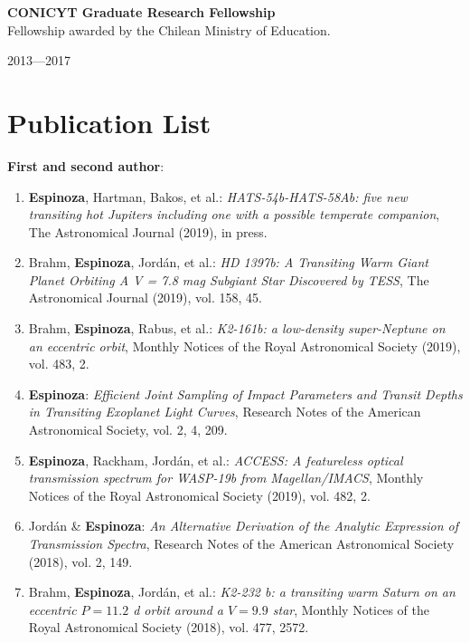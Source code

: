 \documentclass[12pt, a4paper]{article} %
\begin{document}
\begin{minipage}[t]{0.7\textwidth}
\begin{flushleft}%
  \setlength{\leftskip}{0.2cm}%
\textbf{CONICYT Graduate Research Fellowship}\\
Fellowship awarded by the Chilean Ministry of Education.
\end{flushleft}
\end{minipage}
\begin{minipage}[t]{0.3\textwidth}
\hfill 2013---2017
\end{minipage}

\section*{Publication List}
\begin{flushleft}%
  \setlength{\leftskip}{0.2cm}%
\textbf{First and second author}:
\begin{enumerate}
\setlength\itemsep{0.05cm}
\item \textbf{Espinoza}, Hartman, Bakos, et al.: \textit{HATS-54b-HATS-58Ab: five new transiting hot Jupiters including one with a possible temperate companion}, The Astronomical Journal (2019), in press.
\item Brahm, \textbf{Espinoza}, Jord\'an, et al.: \textit{HD 1397b: A Transiting Warm Giant Planet Orbiting A V = 7.8 mag Subgiant Star Discovered by TESS}, The Astronomical Journal (2019), vol. 158, 45.
\item Brahm, \textbf{Espinoza}, Rabus, et al.: \textit{K2-161b: a low-density super-Neptune on an eccentric orbit}, Monthly Notices of the Royal Astronomical Society (2019), vol. 483, 2.
\item \textbf{Espinoza}: \textit{Efficient Joint Sampling of Impact Parameters and Transit Depths in Transiting Exoplanet Light Curves}, Research Notes of the American Astronomical Society, vol. 2, 4, 209.
\item \textbf{Espinoza}, Rackham, Jord\'an, et al.: \textit{ACCESS: A featureless optical transmission spectrum for WASP-19b from Magellan/IMACS}, Monthly Notices of the Royal Astronomical Society (2019), vol. 482, 2.
\item Jord\'an \& \textbf{Espinoza}: \textit{An Alternative Derivation of the Analytic Expression of Transmission Spectra}, Research Notes of the American Astronomical Society (2018), vol. 2, 149.
\item Brahm, \textbf{Espinoza}, Jord\'an, et al.: \textit{K2-232 b: a transiting warm Saturn on an eccentric $P = 11.2$ d orbit around a $V = 9.9$ star}, Monthly Notices of the Royal Astronomical Society (2018), vol. 477, 2572.

\end{enumerate}
\end{flushleft}
\end{document}
